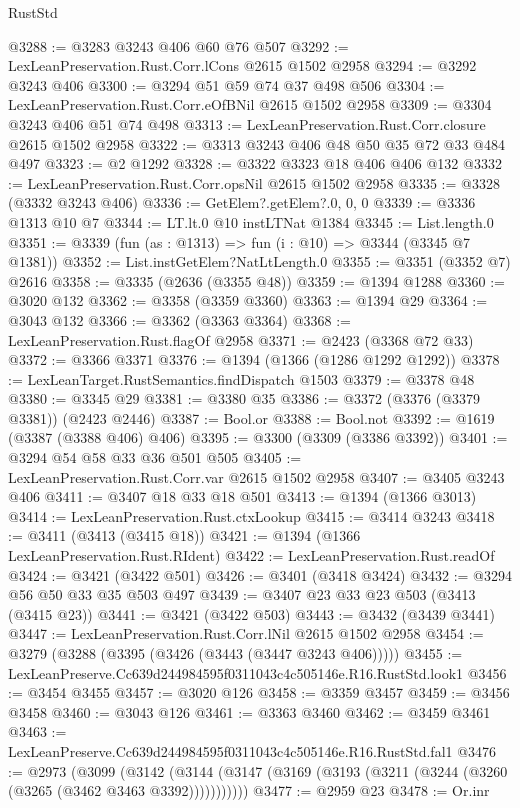 \begin{lexlean}{RustStd}
\begin{coremodule}
@3288 := @3283 @3243 @406 @60 @76 @507
@3292 := LexLeanPreservation.Rust.Corr.lCons @2615 @1502 @2958
@3294 := @3292 @3243 @406
@3300 := @3294 @51 @59 @74 @37 @498 @506
@3304 := LexLeanPreservation.Rust.Corr.eOfBNil @2615 @1502 @2958
@3309 := @3304 @3243 @406 @51 @74 @498
@3313 := LexLeanPreservation.Rust.Corr.closure @2615 @1502 @2958
@3322 := @3313 @3243 @406 @48 @50 @35 @72 @33 @484 @497
@3323 := @2 @1292
@3328 := @3322 @3323 @18 @406 @406 @132
@3332 := LexLeanPreservation.Rust.Corr.opsNil @2615 @1502 @2958
@3335 := @3328 (@3332 @3243 @406)
@3336 := GetElem?.getElem?.{0, 0, 0}
@3339 := @3336 @1313 @10 @7
@3344 := LT.lt.{0} @10 instLTNat @1384
@3345 := List.length.{0}
@3351 := @3339 (fun (as : @1313) => fun (i : @10) => @3344 (@3345 @7 @1381))
@3352 := List.instGetElem?NatLtLength.{0}
@3355 := @3351 (@3352 @7) @2616
@3358 := @3335 (@2636 (@3355 @48))
@3359 := @1394 @1288
@3360 := @3020 @132
@3362 := @3358 (@3359 @3360)
@3363 := @1394 @29
@3364 := @3043 @132
@3366 := @3362 (@3363 @3364)
@3368 := LexLeanPreservation.Rust.flagOf @2958
@3371 := @2423 (@3368 @72 @33)
@3372 := @3366 @3371
@3376 := @1394 (@1366 (@1286 @1292 @1292))
@3378 := LexLeanTarget.RustSemantics.findDispatch @1503
@3379 := @3378 @48
@3380 := @3345 @29
@3381 := @3380 @35
@3386 := @3372 (@3376 (@3379 @3381)) (@2423 @2446)
@3387 := Bool.or
@3388 := Bool.not
@3392 := @1619 (@3387 (@3388 @406) @406)
@3395 := @3300 (@3309 (@3386 @3392))
@3401 := @3294 @54 @58 @33 @36 @501 @505
@3405 := LexLeanPreservation.Rust.Corr.var @2615 @1502 @2958
@3407 := @3405 @3243 @406
@3411 := @3407 @18 @33 @18 @501
@3413 := @1394 (@1366 @3013)
@3414 := LexLeanPreservation.Rust.ctxLookup
@3415 := @3414 @3243
@3418 := @3411 (@3413 (@3415 @18))
@3421 := @1394 (@1366 LexLeanPreservation.Rust.RIdent)
@3422 := LexLeanPreservation.Rust.readOf
@3424 := @3421 (@3422 @501)
@3426 := @3401 (@3418 @3424)
@3432 := @3294 @56 @50 @33 @35 @503 @497
@3439 := @3407 @23 @33 @23 @503 (@3413 (@3415 @23))
@3441 := @3421 (@3422 @503)
@3443 := @3432 (@3439 @3441)
@3447 := LexLeanPreservation.Rust.Corr.lNil @2615 @1502 @2958
@3454 := @3279 (@3288 (@3395 (@3426 (@3443 (@3447 @3243 @406)))))
@3455 := LexLeanPreserve.Cc639d244984595f0311043c4c505146e.R16.RustStd.look1
@3456 := @3454 @3455
@3457 := @3020 @126
@3458 := @3359 @3457
@3459 := @3456 @3458
@3460 := @3043 @126
@3461 := @3363 @3460
@3462 := @3459 @3461
@3463 := LexLeanPreserve.Cc639d244984595f0311043c4c505146e.R16.RustStd.fal1
@3476 := @2973
    (@3099
      (@3142 (@3144 (@3147 (@3169 (@3193 (@3211 (@3244 (@3260 (@3265 (@3462 @3463 @3392)))))))))))
@3477 := @2959 @23
@3478 := Or.inr

\end{coremodule}
\end{lexlean}
